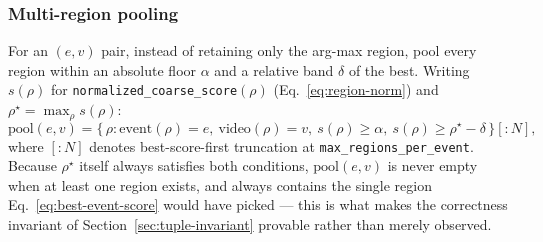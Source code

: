 \documentclass[11pt]{article}
\newcommand{\code}[1]{\texttt{\small #1}}
\begin{document}
\subsubsection{Multi-region pooling}
For an $(e, v)$ pair, instead of retaining only the arg-max region, pool
every region within an absolute floor $\alpha$ and a relative band $\delta$
of the best. Writing $s(\rho)$ for \code{normalized\_coarse\_score}$(\rho)$
(Eq.~\ref{eq:region-norm}) and $\rho^\star = \max_\rho s(\rho)$:
\begin{equation}
  \mathrm{pool}(e, v) = \bigl\{\, \rho : \mathrm{event}(\rho){=}e,\ \mathrm{video}(\rho){=}v,\
    s(\rho) \ge \alpha,\ s(\rho) \ge \rho^\star - \delta \,\bigr\}[{:}N],
  \label{eq:pool}
\end{equation}
where $[{:}N]$ denotes best-score-first truncation at
\code{max\_regions\_per\_event}. Because $\rho^\star$ itself always
satisfies both conditions, $\mathrm{pool}(e,v)$ is never empty when at
least one region exists, and always contains the single region
Eq.~\ref{eq:best-event-score} would have picked --- this is what makes the
correctness invariant of Section~\ref{sec:tuple-invariant} provable rather
than merely observed.
\end{document}
